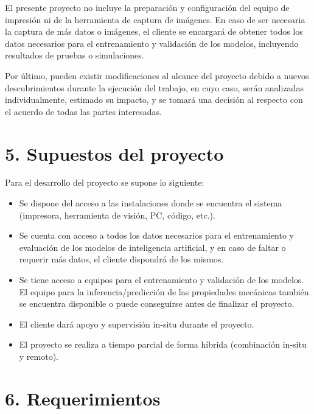 \documentclass[
11pt, %
]{charter}
\begin{document}
El presente proyecto no incluye la preparación y configuración del equipo de impresión ni de la herramienta de captura de imágenes. En caso de ser necesaria la captura de más datos o imágenes, el cliente se encargará de obtener todos los datos necesarios para el entrenamiento y validación de los modelos, incluyendo resultados de pruebas o simulaciones. 

Por último, pueden existir modificaciones al alcance del proyecto debido a nuevos descubrimientos durante la ejecución del trabajo, en cuyo caso, serán analizadas individualmente, estimado su impacto, y se tomará una decisión al respecto con el acuerdo de todas las partes interesadas.


\section{5. Supuestos del proyecto}
\label{sec:supuestos}

Para el desarrollo del proyecto se supone lo siguiente:

\begin{itemize}
	\item Se dispone del acceso a las instalaciones donde se encuentra el sistema (impresora, herramienta de visión, PC, código, etc.).
	\item Se cuenta con acceso a todos los datos necesarios para el entrenamiento y evaluación de los modelos de inteligencia artificial, y en caso de faltar o requerir más datos, el cliente dispondrá de los mismos.
	\item Se tiene acceso a equipos para el entrenamiento y validación de los modelos. El equipo para la inferencia/predicción de las propiedades mecánicas también se encuentra disponible o puede conseguirse antes de finalizar el proyecto.
    \item El cliente dará apoyo y supervisión in-situ durante el proyecto.
    \item El proyecto se realiza a tiempo parcial de forma híbrida (combinación in-situ y remoto).
\end{itemize}

\section{6. Requerimientos}
\label{sec:requerimientos}
\end{document}
